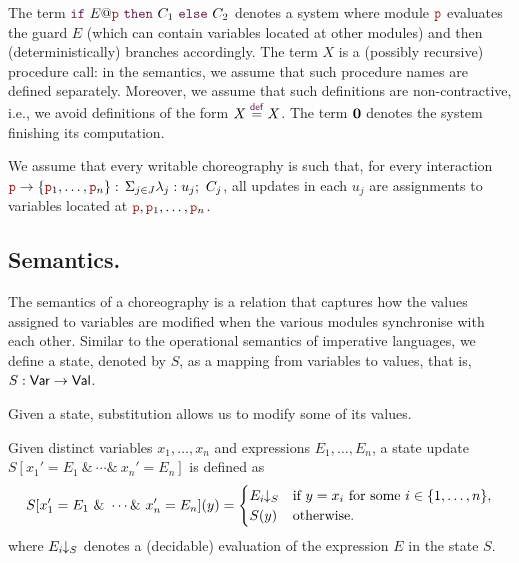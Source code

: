 The term $\ifTE {E}{\nr}{C_1}{C_2}$ denotes a system where module
  $\role p$ evaluates the guard $E$ (which can contain variables
  located at other modules) and then (deterministically) branches
  accordingly.  The term $X$ is a (possibly recursive) procedure call:
  in the semantics, we assume that such procedure names are defined
  separately. Moreover, we assume that such definitions are
  non-contractive, i.e., we avoid definitions of the form
  $X\stackrel{\textcolor{sh_keyword}{\mathsf{def}}}{=}X$. The term
  $\mathbf{0}$ denotes the system finishing its computation.

  \begin{assumption}\label{ass:0}
    We assume that every writable choreography is such that, for every
    interaction $\interact{\nr}{\nr_1,\ldots,\nr_n}$, all updates in
    each $u_j$ are assignments to variables located at
    $\nr, \nr_1,\ldots,\nr_n$.
  \end{assumption}
  
\subsection{Semantics.}
The semantics of a choreography is a relation that captures how the
values assigned to variables are modified when the various modules
synchronise with each other. Similar to the operational semantics of
imperative languages, we define a state, denoted by $S$, as a mapping
from variables to values, that is, $S : \mathsf{Var} \rightarrow \mathsf{Val}$.

Given a state, substitution allows us to modify some of its values.

\begin{definition}
  Given distinct variables $x_1,\ldots,x_n$ and expressions
  $E_1,\ldots,E_n$, a state update
  $S[x_1' = E_1\ \&\ \cdots \&\ x_n' = E_n]$ is defined as
  \[
    S[x_1' = E_1\ \&\ \cdots \&\ x_n' = E_n](y) =
    \begin{cases}
      E_i\!\!\downarrow_{S} & \text{if } y = x_i \text{ for some } i \in \{1, \ldots, n\},\\
      S(y)          & \text{otherwise.}
    \end{cases}
  \]
  where $E_i\!\!\downarrow_{S}$ denotes a (decidable) evaluation of the
  expression $E$ in the state $S$.
\end{definition}

